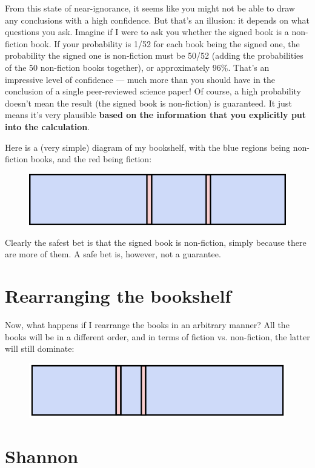 \documentclass[a4paper, 12pt]{article}
\begin{document}
From this state of near-ignorance, it seems like you might not be able to draw
any conclusions with a high confidence. But that's an illusion: it depends on
what questions you ask. Imagine if I were to ask you whether the signed book
is a non-fiction book. If your probability is 1/52 for each book being the
signed one, the probability the signed one is non-fiction must be
50/52 (adding the probabilities of the 50 non-fiction books together), 
or approximately 96\%. That's an impressive level of confidence --- much more than you should have in the conclusion of a single peer-reviewed science paper!
Of course, a high probability doesn't mean the result (the signed book is
non-fiction) is guaranteed. It just means it's very plausible {\bf based on the
information that you explicitly put into the calculation}.

Here is a (very simple) diagram of my bookshelf, with the blue regions
being non-fiction books, and the red being fiction:
\begin{figure}[ht!]
\centering
\includegraphics{bookshelf.png}
\end{figure}
Clearly the safest bet is that the signed book is non-fiction, simply because
there are more of them. A safe bet is, however, not a guarantee.

\section*{Rearranging the bookshelf}
Now, what happens if I rearrange the books in an arbitrary manner? All the books
will be in a different order, and in terms of fiction vs. non-fiction, the
latter will still dominate:

\begin{figure}[ht!]
\centering
\includegraphics[scale=0.61]{bookshelf2.png}
\end{figure}


\section*{Shannon}
\end{document}
